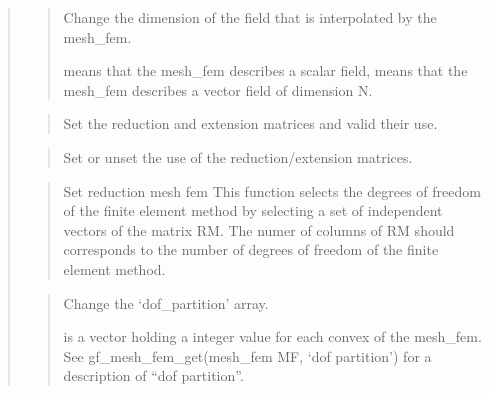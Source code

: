 \documentclass[a4paper,11pt,english]{sphinxmanual}
\begin{document}
\begin{quote}
\sphinxAtStartPar
{}
\begin{quote}

\sphinxAtStartPar
Change the  dimension of the field that is interpolated by the mesh\_fem.

\sphinxAtStartPar
{} means that the mesh\_fem describes a scalar field,  means
that the mesh\_fem describes a vector field of dimension N.
\end{quote}

\sphinxAtStartPar
{}
\begin{quote}

\sphinxAtStartPar
Set the reduction and extension matrices and valid their use.
\end{quote}

\sphinxAtStartPar
{}
\begin{quote}

\sphinxAtStartPar
Set or unset the use of the reduction/extension matrices.
\end{quote}

\sphinxAtStartPar
{}
\begin{quote}

\sphinxAtStartPar
Set reduction mesh fem
This function selects the degrees of freedom of the finite element
method by selecting a set of independent vectors of the matrix RM.
The numer of columns of RM should corresponds to the number of degrees
of freedom of the finite element method.
\end{quote}

\sphinxAtStartPar
{}
\begin{quote}

\sphinxAtStartPar
Change the ‘dof\_partition’ array.

\sphinxAtStartPar
{} is a vector holding a integer value for each convex of the mesh\_fem.
See gf\_mesh\_fem\_get(mesh\_fem MF, ‘dof partition’) for a description of “dof partition”.
\end{quote}


\end{quote}
\end{document}

